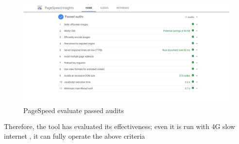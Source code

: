 \begin{center}
	\begin{figure}[H]
		\centering
		\includegraphics[width=1\columnwidth]{images/chap5/pagespeed3.PNG}
		\caption{PageSpeed evaluate passed audits}
	\end{figure}
\end{center}
 Therefore, the tool has evaluated its effectiveness; even it is run with 4G slow internet , it can fully operate the above criteria
